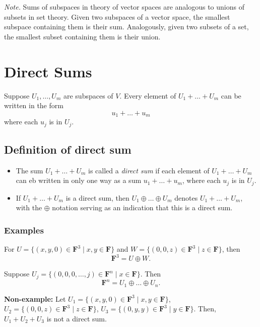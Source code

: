 \documentclass[11pt]{article}
\begin{document}
    \emph{Note.} Sums of subspaces in theory of vector spaces are analogous to unions of subsets in set theory. Given two subspaces of a vector space, the smallest subspace containing them is their sum. Analogously, given two subsets of a set, the smallest subset containing them is their union.

    \section{Direct Sums}

    Suppose \(U_1, \dots, U_m\) are subspaces of $V$. Every element of \(U_1 + \dots + U_m\) can be written in the form \[u_1 + \dots + u_m\] where each \(u_j\) is in $U_j$.

    \subsection{Definition of direct sum}

    \begin{itemize}
        \item The sum \(U_1 + \dots + U_m\) is called a \emph{direct sum} if each element of \(U_1 + \dots + U_m\) can eb written in only one way as a sum \(u_1 + \dots + u_m\), where each \(u_j\) is in \(U_j\).
        \item If \(U_1 + \dots + U_m\) is a direct sum, then \(U_1 \oplus \dots \oplus U_m\) denotes \(U_1 + \dots + U_m\), with the \(\oplus\) notation serving as an indication that this is a direct sum. 
    \end{itemize}

    \subsubsection{Examples}

    For \(U = \{(x,y,0) \in \textbf{F}^3 \mid x,y \in \textbf{F}\}\) and \(W = \{(0,0,z) \in \textbf{F}^3 \mid z \in \textbf{F}\}\), then \[\textbf{F}^3 = U \oplus W.\]

    Suppose \(U_j = \{(0,0,0,\dots, j) \in \textbf{F}^n \mid x \in \textbf{F}\}\). Then \[\textbf{F}^n = U_1 \oplus \dots \oplus U_n.\]

    \textbf{Non-example:} Let \(U_1 = \{(x,y,0) \in \textbf{F}^3 \mid x,y \in \textbf{F}\}\), \(U_2 = \{(0,0,z) \in \textbf{F}^3 \mid z \in \textbf{F}\}\), \(U_3 = \{(0,y,y) \in \textbf{F}^3 \mid y \in \textbf{F}\}\). Then, \(U_1 + U_2 + U_3\) is not a direct sum. 
\end{document}
